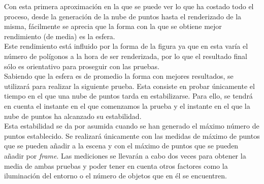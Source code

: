 Con esta primera aproximación en la que se puede ver lo que ha costado todo el proceso, desde la generación de la nube de puntos hasta el renderizado de la misma,  fácilmente se aprecia que la forma con la que se obtiene mejor rendimiento (de media) es la esfera.\\

Este rendimiento está influido por la forma de la figura ya que en esta varía el número de polígonos a la hora de ser renderizada, por lo que el resultado final sólo es orientativo para proseguir con las pruebas. \\

Sabiendo que la esfera es de promedio la forma con mejores resultados, se utilizará para realizar la siguiente prueba. Esta consiste en probar únicamente el tiempo en el que una nube de puntos tarda en estabilizarse. Para ello, se tendrá en cuenta el instante en el que comenzamos la prueba y el instante en el que la nube de puntos ha alcanzado su estabilidad. \\

Esta estabilidad se da por asumida cuando se han generado el máximo número de puntos establecido. Se realizará únicamente con las medidas de máximo de puntos que se pueden añadir a la escena y con el máximo de puntos que se pueden añadir por \textit{frame}. Las mediciones se llevarán a cabo dos veces para obtener la media de ambas pruebas y poder tener en cuenta otros factores como la iluminación del entorno o el número de objetos que en él se encuentren.\\

\begin{table}[H]
\centering
{}
\caption{Tiempo empleado por la aplicación para generar una nube de puntos estable. }
\label{cuadro:comparacionpesopreciosHMD}
\end{table}

